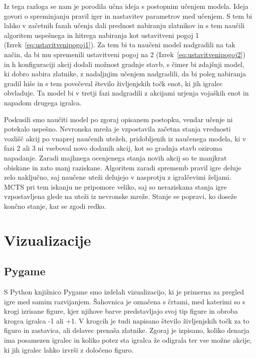 \documentclass[a4paper, 12pt]{book}
\begin{document}
{Iz tega razloga se nam je porodila učna ideja s postopnim učenjem modela. 
Ideja govori o spreminjanju pravil iger in nastavitev parametrov med učenjem.
S tem bi lahko v začetnih fazah učenja dali prednost nabiranju zlatnikov in s tem naučili algoritem uspešnega in hitrega nabiranja kot ustavitveni pogoj 1 (Izrek~\ref{eq:ustavitvenipogoj1}).
Za tem bi ta naučeni model nadgradili na tak način, da bi mu spremenili ustavitveni pogoj na 2 (Izrek~\ref{eq:ustavitvenipogoj2}) in h konfiguraciji akcij dodali možnost gradnje stavb, s čimer bi zdajšnji model, ki dobro nabira zlatnike, z nadaljnjim učenjem nadgradili, da bi poleg nabiranja gradil hiše in s tem povečeval število življenjskih točk enot, ki jih igralec obvladuje.
Ta model bi v tretji fazi nadgradili z akcijami urjenja vojaških enot in napadom drugega igralca.

Poskusili smo naučiti model po zgoraj opisanem postopku, vendar učenje ni potekalo uspešno.
Nevronska mreža je vzpostavila začetna stanja vrednosti vozlišč akcij po vnaprej naučenih utežeh, pridobljenih iz naučenega modela, ki v fazi 2 ali 3 ni vseboval novo dodanih akcij, kot so gradnja stavb oziroma napadanje.
Zaradi majhnega ocenjenega stanja novih akcij so te manjkrat obiskane in zato manj raziskane.
Algoritem zaradi sprememb pravil igre deluje zelo naključno, saj naučene uteži delujejo v nasprotju z igralčevimi željami.
MCTS pri tem iskanju ne pripomore veliko, saj so neraziskana stanja igre vzpostavljena glede na uteži iz nevronske mreže.
Stanje se popravi, ko doseže končno stanje, kar se zgodi redko.


\chapter{Vizualizacije}
\label{chvizualizacija}

\section{Pygame}
S Python knjižnico Pygame smo izdelali vizualizacijo, ki je primerna za pregled igre med samim razvijanjem. 
Šahovnica je označena s črtami, med katerimi so s krogi izrisane figure, kjer njihove barve predstavljajo svoj tip figure in obroba krogca igralca -1 ali +1.
V krogcih je tudi napisano število življenjskih točk za to figuro in zastavica, ali delavec prenaša zlatnike.
Zgoraj je izpisano, koliko denarja ima posamezen igralec in koliko potez sta igralca že odigrala ter vse možne akcije, ki jih igralec lahko izvrši z določeno figuro.

}
\end{document}
